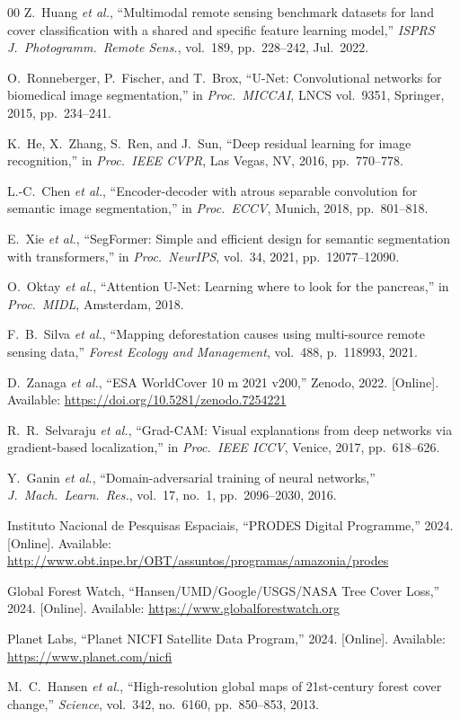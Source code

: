 \documentclass[10pt,conference]{IEEEtran}
\begin{document}
\begin{thebibliography}{00}
Z.~Huang \textit{et al.}, ``Multimodal remote sensing benchmark datasets for land
cover classification with a shared and specific feature learning model,''
\textit{ISPRS J.\ Photogramm.\ Remote Sens.}, vol.~189, pp.~228--242, Jul.\ 2022.

O.~Ronneberger, P.~Fischer, and T.~Brox, ``U-Net: Convolutional networks for
biomedical image segmentation,'' in \textit{Proc.\ MICCAI}, LNCS vol.~9351,
Springer, 2015, pp.~234--241.

K.~He, X.~Zhang, S.~Ren, and J.~Sun, ``Deep residual learning for image
recognition,'' in \textit{Proc.\ IEEE CVPR}, Las Vegas, NV, 2016,
pp.~770--778.

L.-C.~Chen \textit{et al.}, ``Encoder-decoder with atrous separable convolution
for semantic image segmentation,'' in \textit{Proc.\ ECCV}, Munich, 2018,
pp.~801--818.

E.~Xie \textit{et al.}, ``SegFormer: Simple and efficient design for semantic
segmentation with transformers,'' in \textit{Proc.\ NeurIPS}, vol.~34, 2021,
pp.~12077--12090.

O.~Oktay \textit{et al.}, ``Attention U-Net: Learning where to look for the
pancreas,'' in \textit{Proc.\ MIDL}, Amsterdam, 2018.

F.~B.~Silva \textit{et al.}, ``Mapping deforestation causes using multi-source
remote sensing data,'' \textit{Forest Ecology and Management}, vol.~488,
p.~118993, 2021.

D.~Zanaga \textit{et al.}, ``ESA WorldCover 10 m 2021 v200,'' Zenodo, 2022.
[Online]. Available: \url{https://doi.org/10.5281/zenodo.7254221}

R.~R.~Selvaraju \textit{et al.}, ``Grad-CAM: Visual explanations from deep
networks via gradient-based localization,'' in \textit{Proc.\ IEEE ICCV},
Venice, 2017, pp.~618--626.

Y.~Ganin \textit{et al.}, ``Domain-adversarial training of neural networks,''
\textit{J.\ Mach.\ Learn.\ Res.}, vol.~17, no.~1, pp.~2096--2030, 2016.

Instituto Nacional de Pesquisas Espaciais, ``PRODES Digital Programme,'' 2024.
[Online]. Available: \url{http://www.obt.inpe.br/OBT/assuntos/programas/amazonia/prodes}

Global Forest Watch, ``Hansen/UMD/Google/USGS/NASA Tree Cover Loss,'' 2024.
[Online]. Available: \url{https://www.globalforestwatch.org}

Planet Labs, ``Planet NICFI Satellite Data Program,'' 2024.
[Online]. Available: \url{https://www.planet.com/nicfi}

M.~C.~Hansen \textit{et al.}, ``High-resolution global maps of 21st-century
forest cover change,'' \textit{Science}, vol.~342, no.~6160, pp.~850--853, 2013.

\end{thebibliography}
\end{document}
